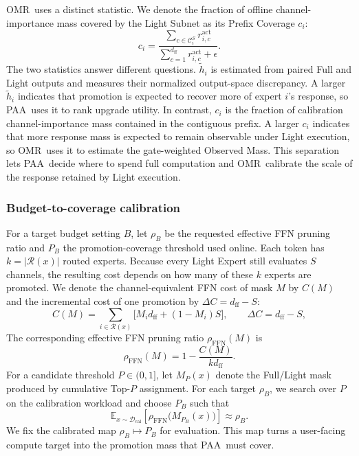 \documentclass{article}
\newcommand{\PAA}{\textsc{PAA}}
\newcommand{\OMR}{\textsc{OMR}}
\newcommand{\Rset}{\mathcal{R}}
\begin{document}
\OMR\ uses a distinct statistic. We denote the fraction of offline channel-importance mass covered by the Light Subnet as its Prefix Coverage $c_i$:
\begin{equation}
  c_i=\frac{\sum_{c\in\mathcal{C}_i^S}r^{\mathrm{act}}_{i,c}}
  {\sum_{c=1}^{d_{\mathrm{ff}}}r^{\mathrm{act}}_{i,c}+\epsilon}.
  \label{eq:prefix-coverage}
\end{equation}
The two statistics answer different questions. $\widetilde h_i$ is estimated from paired Full and Light outputs and measures their normalized output-space discrepancy. A larger $\widetilde h_i$ indicates that promotion is expected to recover more of expert $i$'s response, so \PAA\ uses it to rank upgrade utility. In contrast, $c_i$ is the fraction of calibration channel-importance mass contained in the contiguous prefix. A larger $c_i$ indicates that more response mass is expected to remain observable under Light execution, so \OMR\ uses it to estimate the gate-weighted Observed Mass. This separation lets \PAA\ decide where to spend full computation and \OMR\ calibrate the scale of the response retained by Light execution.

\subsubsection{Budget-to-coverage calibration}

For a target budget setting $B$, let $\rho_B$ be the requested effective FFN pruning ratio and $P_B$ the promotion-coverage threshold used online. Each token has $k=|\Rset(x)|$ routed experts. Because every Light Expert still evaluates $S$ channels, the resulting cost depends on how many of these $k$ experts are promoted. We denote the channel-equivalent FFN cost of mask $M$ by $C(M)$ and the incremental cost of one promotion by $\Delta C=d_{\mathrm{ff}}-S$:
\begin{equation}
  C(M)=\sum_{i\in\Rset(x)}\big[M_i d_{\mathrm{ff}}+(1-M_i)S\big],
  \qquad \Delta C=d_{\mathrm{ff}}-S,
  \label{eq:cost}
\end{equation}
The corresponding effective FFN pruning ratio $\rho_{\mathrm{FFN}}(M)$ is
\begin{equation}
  \rho_{\mathrm{FFN}}(M)=1-\frac{C(M)}{k d_{\mathrm{ff}}}.
  \label{eq:prune-ratio}
\end{equation}
For a candidate threshold $P\in(0,1]$, let $M_P(x)$ denote the Full/Light mask produced by cumulative Top-$P$ assignment. For each target $\rho_B$, we search over $P$ on the calibration workload and choose $P_B$ such that
\begin{equation}
  \mathbb{E}_{x\sim\mathcal{D}_{\mathrm{cal}}}
  \left[\rho_{\mathrm{FFN}}\big(M_{P_B}(x)\big)\right]\approx\rho_B.
  \label{eq:budget-calibration}
\end{equation}
We fix the calibrated map $\rho_B\mapsto P_B$ for evaluation. This map turns a user-facing compute target into the promotion mass that \PAA\ must cover.
\end{document}
